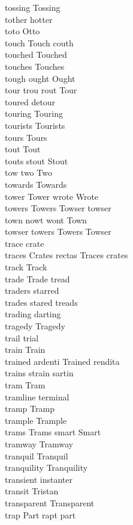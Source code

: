 tossing Tossing\\
tother hotter\\
toto Otto\\
touch Touch couth\\
touched Touched\\
touches Touches\\
tough ought Ought\\
tour trou rout Tour\\
toured detour\\
touring Touring\\
tourists Tourists\\
tours Tours\\
tout Tout\\
touts stout Stout\\
tow two Two\\
towards Towards\\
tower Tower wrote Wrote\\
towers Towers Towser towser\\
town nowt wont Town\\
towser towers Towers Towser\\
trace crate\\
traces Crates rectas Traces crates\\
track Track\\
trade Trade tread\\
traders starred\\
trades stared treads\\
trading darting\\
tragedy Tragedy\\
trail trial\\
train Train\\
trained ardenti Trained rendita\\
trains strain sartin\\
tram Tram\\
tramline terminal\\
tramp Tramp\\
trample Trample\\
trams Trams smart Smart\\
tramway Tramway\\
tranquil Tranquil\\
tranquility Tranquility\\
transient instanter\\
transit Tristan\\
transparent Transparent\\
trap Part rapt part\\
